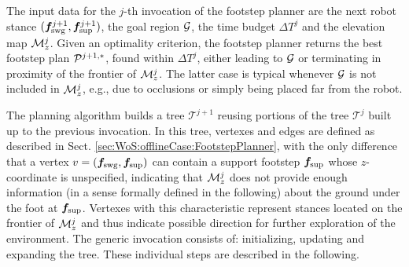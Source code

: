 The input data for the $j$-th invocation of the footstep planner are the next robot stance $({\bm{f}}_{\rm swg}^{j+1}, {\bm{f}}_{\rm sup}^{j+1})$, the goal region $\cal G$, the time budget ${\Delta T}^j$ and the elevation map ${\cal M}_z^j$. 
Given an optimality criterion, the footstep planner returns the best footstep plan ${\cal P}^{j+1,*}$, found within ${\Delta T}^j$, either leading to $\cal G$ or terminating in proximity of the frontier of ${\cal M}_z^j$.
The latter case is typical whenever $\cal G$ is not included in ${\cal M}_z^j$, e.g., due to occlusions or simply being placed far from the robot.

The planning algorithm builds a tree $\mathcal{T}^{j+1}$ reusing portions of the tree $\mathcal{T}^{j}$ built up to the previous invocation. 
In this tree, vertexes and edges are defined as described in Sect. \ref{sec:WoS:offlineCase:FootstepPlanner}, with the only difference that a vertex $v = ({\bm{f}}_{\rm swg}, {\bm{f}}_{\rm sup})$ can contain a support footstep ${\bm{f}}_{\rm sup}$ whose $z$-coordinate is unspecified, indicating that ${\cal M}_z^j$ does not provide enough information (in a sense formally defined in the following) about the ground under the foot at ${\bm{f}}_{\rm sup}$. 
Vertexes with this characteristic represent stances located on the frontier of ${\cal M}_z^j$ and thus indicate possible direction for further exploration of the environment. 
%
The generic invocation consists of: initializing, updating and expanding the tree. These individual steps are described in the following.

